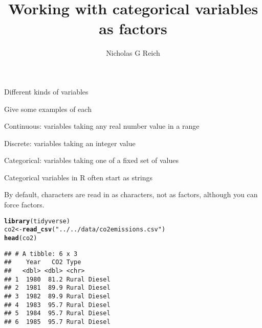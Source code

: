 \documentclass[table]{beamer}\usepackage[]{graphicx}\usepackage[]{color}
\title{Working with categorical variables as factors}
\author{Nicholas G Reich}
\makeatletter
\newcommand{\hlstr}[1]{\textcolor[rgb]{0.192,0.494,0.8}{#1}}%
\newcommand{\hlstd}[1]{\textcolor[rgb]{0.345,0.345,0.345}{#1}}%
\newcommand{\hlkwb}[1]{\textcolor[rgb]{0.69,0.353,0.396}{#1}}%
\newcommand{\hlkwd}[1]{\textcolor[rgb]{0.737,0.353,0.396}{\textbf{#1}}}%
\newenvironment{kframe}{%
 \def\at@end@of@kframe{}%
 \ifinner\ifhmode%
  \def\at@end@of@kframe{\end{minipage}}%
  \begin{minipage}{\columnwidth}%
 \fi\fi%
 \def\FrameCommand##1{\hskip\@totalleftmargin \hskip-\fboxsep
 \colorbox{shadecolor}{##1}\hskip-\fboxsep
     \hskip-\linewidth \hskip-\@totalleftmargin \hskip\columnwidth}%
 \MakeFramed {\advance\hsize-\width
   \@totalleftmargin\z@ \linewidth\hsize
   \@setminipage}}%
 {\par\unskip\endMakeFramed%
 \at@end@of@kframe}
\newenvironment{knitrout}{}{} %
\makeatother
\begin{document}
\begin{frame}[plain]
	\titlepage
\end{frame}






\begin{frame}{Different kinds of variables}
\begin{block}{Give some examples of each}

\bi
    \item Continuous: variables taking any real number value in a range
    \vspace{4em}
    \item Discrete: variables taking an integer value
    \vspace{4em}
    \item Categorical: variables taking one of a fixed set of values
\ei

\end{block}

\end{frame}



\begin{frame}[fragile]{Categorical variables in R often start as strings}

By default, characters are read in as characters, not as factors, although you can force factors.

\begin{knitrout}\tiny
{}\color{fgcolor}\begin{kframe}
\begin{alltt}
\hlkwd{library}\hlstd{(tidyverse)}
\hlstd{co2} \hlkwb{<-} \hlkwd{read_csv}\hlstd{(}\hlstr{"../../data/co2emissions.csv"}\hlstd{)}
\hlkwd{head}\hlstd{(co2)}
\end{alltt}
\begin{verbatim}
## # A tibble: 6 x 3
##    Year   CO2 Type        
##   <dbl> <dbl> <chr>       
## 1  1980  81.2 Rural Diesel
## 2  1981  89.9 Rural Diesel
## 3  1982  89.9 Rural Diesel
## 4  1983  95.7 Rural Diesel
## 5  1984  95.7 Rural Diesel
## 6  1985  95.7 Rural Diesel
\end{verbatim}
\end{kframe}
\end{knitrout}


\end{frame}
\end{document}
